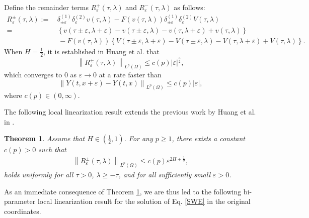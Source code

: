 \documentclass[11pt,reqno]{amsart}
\numberwithin{equation}{section}
\newtheorem{theorem}{Theorem}[section]
\newcommand{\1}{{\bf 1}}
\newcommand{\2}{{\bf 2}}
\begin{document}
Define the remainder terms $R_{\varepsilon}^+(\tau, \lambda)$ and $R_{\varepsilon}^-(\tau, \lambda)$ as follows:  
 \begin{equation}\label{eq R}
\begin{split}
 R_{\varepsilon}^{\pm}(\tau, \lambda):=& \,\delta_{\pm\varepsilon}^{(1)}\delta_{\varepsilon}^{(2)}v(\tau, \lambda)-F(v(\tau, \lambda))\delta_{\pm\varepsilon}^{(1)}\delta_{\varepsilon}^{(2)}V(\tau, \lambda)\\
=&\, \left\{ v(\tau\pm\varepsilon, \lambda+\varepsilon)-v(\tau\pm\varepsilon, \lambda) - v(\tau, \lambda+\varepsilon)+v(\tau, \lambda)\right\}\\
& \,\, -F(v(\tau, \lambda))\left\{V(\tau\pm\varepsilon, \lambda+\varepsilon)-V(\tau\pm\varepsilon, \lambda)-V(\tau, \lambda+\varepsilon)+V(\tau, \lambda) \right\}.
\end{split}
\end{equation}
When $H=\frac12$,  it is established   in  Huang et al. \cite{HOO2024} that
 $$\left\| R_{\varepsilon}^{\pm}(\tau, \lambda)\right\|_{L^p(\Omega)}\le c(p)|\varepsilon|^{\frac{3}{2}},$$ 
 which    converges to $0$   as $\varepsilon\to 0$ at a rate   faster than 
 $$ \left\|Y(t, x + \varepsilon) -Y(t, x)\right\|_{L^p(\Omega)}\le c(p)  |\varepsilon|, $$
 where $c(p)\in(0,\infty)$. 
 
 
The following  local linearization   result extends the previous work by  Huang et al. in \cite{HOO2024}. 
    \begin{theorem}\label{thm error 1} Assume that $H \in \left(\frac12, 1\right)$. For any $p \ge 1$, there exists a constant $c(p)>0$ such that 
\begin{align}\label{eq error}
\left\| R_{\varepsilon}^{\pm}(\tau, \lambda)\right\|_{L^p(\Omega)} \le c(p)\varepsilon^{2H+\frac{1}{2}},
\end{align}
holds uniformly for all $\tau > 0$, $\lambda \ge -\tau$, and for all sufficiently small $\varepsilon > 0$.
\end{theorem}
  
 
  As an immediate consequence of Theorem \ref{thm error 1}, we are thus led to the following bi-parameter local linearization result for the solution of Eq. \eqref{SWE} in the original coordinates. 
  
\end{document}
